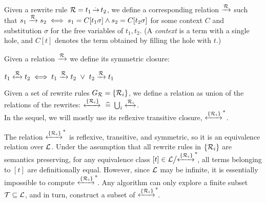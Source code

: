 \begin{definition}\label{screening:rw-equiv}
Given a rewrite rule $\mathcal{R} = t_1 \operatorname{\overset{.\,}{\rightarrow}} t_2$, we define a corresponding relation
$\xrightarrow[]{\mathcal{R}}$ such that $s_1 \xrightarrow[]{\mathcal{R}} s_2 \iff s_1=C[t_1\sigma] \land s_2=C[t_2\sigma]$
for some context $C$ and substitution $\sigma$ for the free variables of $t_1, t_2$.
(A \emph{context} is a term with a single hole, and $C[t]$ denotes the term obtained by filling the
hole with $t$.)
\end{definition}

\begin{definition}\label{screening:symmetric}
Given a relation $\xrightarrow[]{\mathcal{R}}$ we define its symmetric closure:

\centering
$t_1 \xleftrightarrow[]{\mathcal{R}\,} t_2 \iff t_1 \xrightarrow[]{\mathcal{R}} t_2 ~\lor~ t_2 \xrightarrow[]{\mathcal{R}} t_1$
\end{definition}

\begin{definition}\label{screening:rw-set-equiv}
Given a set of rewrite rules $G_{\mathcal{R}}=\{\mathcal{R}_i\}$, we define a relation as union of the relations of the rewrites: $\xleftrightarrow[]{\{\mathcal{R}_i\}} \operatorname{~\widehat{=}~} \bigcup_{i}\xleftrightarrow[]{\mathcal{R}_i}$.\\
In the sequel, we will mostly use its reflexive transitive closure, $\xleftrightarrow[]{\{\mathcal{R}_i\}}^*$.
\end{definition}

The relation $\xleftrightarrow[]{\{\mathcal{R}_i\}}^*$ is reflexive, transitive, and symmetric,
so it is an equivalence relation over $\mathcal{L}$.
Under the assumption that all rewrite rules in $\{\mathcal{R}_i\}$ are semantics preserving, for any equivalence class $[t] \in \mathcal{L} \big/ {\xleftrightarrow[]{\{\mathcal{R}_i\}}^*}\!$, all terms belonging to $[t]$ are definitionally equal.
However, since $\mathcal{L}$ may be infinite, it is essentially impossible to compute $\xleftrightarrow[]{\{\mathcal{R}_i\}}^*\!$.
Any algorithm can only explore a finite subset $\mathcal{T} \subseteq \mathcal{L}$, and in turn,
construct a subset of $\xleftrightarrow[]{\{\mathcal{R}_i\}}^*\!$.

